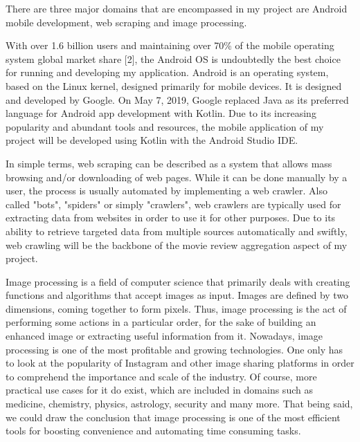 \documentclass[12pt,a4paper,twoside]{report}
\begin{document}
There are three major domains that are encompassed in my project are Android mobile development, web scraping and image processing.


With over 1.6 billion users and maintaining over 70\% of the mobile operating system global market share [2], the Android OS is undoubtedly the best choice for running and developing my application. Android is an operating system, based on the Linux kernel, designed primarily for mobile devices. It is designed and developed by Google. On May 7, 2019, Google replaced Java as its preferred language for Android app development with Kotlin. Due to its increasing popularity and abundant tools and resources, the mobile application of my project will be developed using Kotlin with the Android Studio IDE.


In simple terms, web scraping can be described as a system that allows mass browsing and/or downloading of web pages. While it can be done manually by a user, the process is usually automated by implementing a web crawler. Also called "bots", "spiders" or simply "crawlers", web crawlers are typically used for extracting data from websites in order to use it for other purposes. Due to its ability to retrieve targeted data from multiple sources automatically and swiftly, web crawling will be the backbone of the movie review aggregation aspect of my project.


Image processing is a field of computer science that primarily deals with creating functions and algorithms that accept images as input. Images are defined by two dimensions, coming together to form pixels. Thus, image processing is the act of performing some actions in a particular order, for the sake of building an enhanced image or extracting useful information from it. Nowadays, image processing is one of the most profitable and growing technologies. One only has to look at the popularity of Instagram and other image sharing platforms in order to comprehend the importance and scale of the industry. Of course, more practical use cases for it do exist, which are included in domains such as medicine, chemistry, physics, astrology, security and many more. That being said, we could draw the conclusion that image processing is one of the most efficient tools for boosting convenience and automating time consuming tasks. 

\end{document}
